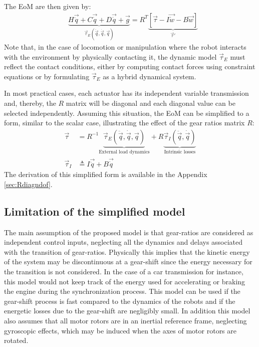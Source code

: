 The EoM are then given by:
%
\begin{align}
	&\underbrace{ H \vec{ \ddot{q} } + C\vec{ \dot{q} } + D \vec{ \dot{q} } + \vec{ g } }_{ \vec{\tau}_{E}(\ddot{\vec{q}},\dot{\vec{q}},\vec{q})}
		= R^T \underbrace{  \left[ 
		\vec{ \tau } - I \vec{ \dot{w} } - B \vec{ w }       
		\right]}_{ \vec{\tau}' } 
 \label{eq:eom_ndof}
\end{align}
%
Note that, in the case of locomotion or manipulation where the robot interacts with the environment by physically contacting it, the dynamic model $\vec{\tau}_{E}$ must reflect the contact conditions, either by computing contact forces using constraint equations or by formulating $\vec{\tau}_{E}$ as a hybrid dynamical system.

In most practical cases, each actuator has its independent variable transmission and, thereby, the $R$ matrix will be diagonal and each diagonal value can be selected independently. Assuming this situation, the EoM can be simplified to a form, similar to the scalar case, illustrating the effect of the gear ratios matrix $R$: 
%
\begin{align}
	\vec{\tau} &= R^{-1} 
	\underbrace{ 
	\vec{\tau}_{E}(\ddot{\vec{q}},\dot{\vec{q}},\vec{q}) 
	}_{\text{External load dynamics}}
	+ R 
	\underbrace{ 
	\vec{\tau}_{I}(\ddot{\vec{q}},\dot{\vec{q}})
		}_{\text{Intrinsic losses}}
	\\ %
	\vec{\tau}_{I} &\triangleq I \vec{ \ddot{q} } + B \vec{ \dot{q} } 
 \label{eq:eom_ndof2}
\end{align}
%
The derivation of this simplified form is available in the Appendix \ref{sec:Rdiagndof}.

\subsection{Limitation of the simplified model}
\label{sec:limitation}
%
The main assumption of the proposed model is that gear-ratios are considered as independent control inputs, neglecting all the dynamics and delays associated with the transition of gear-ratios. Physically this implies that the kinetic energy of the system may be discontinuous at a gear-shift since the energy necessary for the transition is not considered. In the case of a car transmission for instance, this model would not keep track of the energy used for accelerating or braking the engine during the synchronization process. This model can be used if the gear-shift process is fast compared to the dynamics of the robots and if the energetic losses due to the gear-shift are negligibly small. In addition this model also assumes that all motor rotors are in an inertial reference frame, neglecting gyroscopic effects, which may be induced when the axes of motor rotors are rotated.

